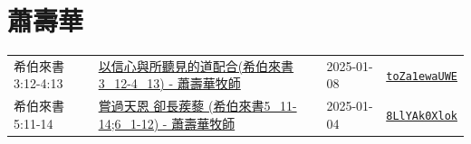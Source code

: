 \documentclass{book}
\begin{document}
\chapter{蕭壽華}\label{ch:preacher9}
\begin{multicols}{3}
\minitoc
\end{multicols}
{ \scriptsize


\begin{xltabular}{\textwidth}{|p{0.15\textwidth} p{0.6\textwidth}|p{0.07\textwidth} p{0.1\textwidth}|}
\hline
希伯來書 3:12-4:13 & \hyperref[sec:toZa1ewaUWE]{以信心與所聽見的道配合(希伯來書3\_12-4\_13) - 蕭壽華牧師} & 2025-01-08 & \href{https://youtube.com/watch?v=toZa1ewaUWE}{\texttt{toZa1ewaUWE}} \\
希伯來書 5:11-14 & \hyperref[sec:8LlYAk0Xlok]{嘗過天恩 卻長蒺藜 (希伯來書5\_11-14;6\_1-12) - 蕭壽華牧師} & 2025-01-04 & \href{https://youtube.com/watch?v=8LlYAk0Xlok}{\texttt{8LlYAk0Xlok}} \\
\hline
\end{xltabular}
}
\newpage
\end{document}
